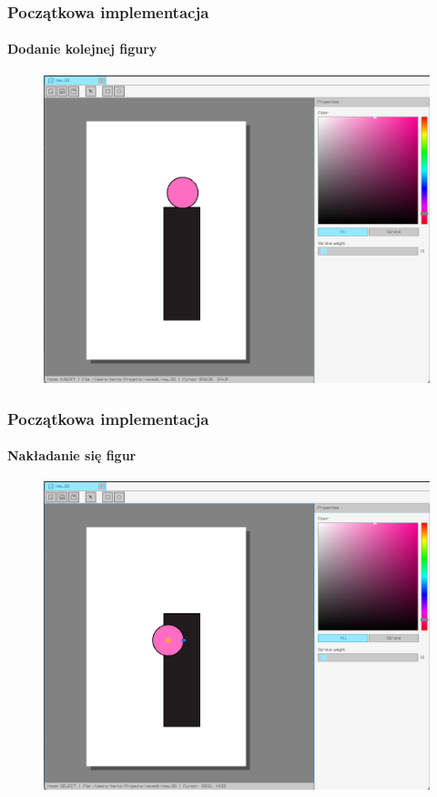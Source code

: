 \documentclass[
	11pt,]{beamer}
\begin{document}
\begin{frame}
	\frametitle{Początkowa implementacja}
	\framesubtitle{Dodanie kolejnej figury}
	
	\begin{figure}
		\includegraphics[height=0.7\textheight]{figures/pro5.png}
	\end{figure}
\end{frame}

\begin{frame}
	\frametitle{Początkowa implementacja}
	\framesubtitle{Nakładanie się figur}
	
	\begin{figure}
		\includegraphics[height=0.7\textheight]{figures/pro6.png}
	\end{figure}
\end{frame}
\end{document}
